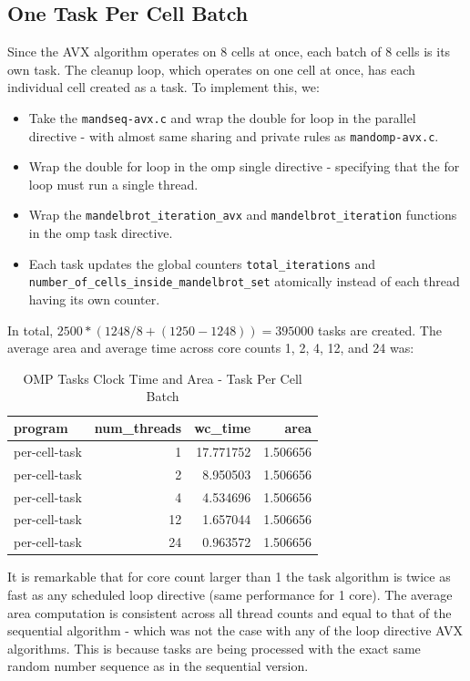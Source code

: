 \documentclass{article}
\begin{document}
\subsection{One Task Per Cell Batch}
Since the AVX algorithm operates on 8 cells at once, 
each batch of 8 cells is its own task. The cleanup loop, which operates on one cell at once, has each individual cell 
created as a task. To implement this, we:
\begin{itemize}
    \item Take the \texttt{mandseq-avx.c} and wrap the double for loop in the parallel directive - with almost same sharing and private rules as \texttt{mandomp-avx.c}.
    \item Wrap the double for loop in the omp single directive - specifying that the for loop must run a single thread. 
    \item Wrap the \texttt{mandelbrot\_iteration\_avx} and \texttt{mandelbrot\_iteration} functions in the omp task directive.
    \item Each task updates the global counters \texttt{total\_iterations} and \texttt{number\_of\_cells\_inside\_mandelbrot\_set} atomically instead of each thread having its own counter.
\end{itemize}
In total, $2500 * (1248 / 8 + (1250 - 1248)) = 395000$ tasks are created.
The average area and average time across core counts 1, 2, 4, 12, and 24 was:
\begin{table}[H]
    \centering
    \caption{OMP Tasks Clock Time and Area - Task Per Cell Batch}
    \fontsize{12}{14}\selectfont
    \begin{tabular}[t]{l|r|r|r}
    \hline
    program & num\_threads & wc\_time & area\\
    \hline
    per-cell-task & 1 & 17.771752 & 1.506656\\
    \hline
    per-cell-task & 2 & 8.950503 & 1.506656\\
    \hline
    per-cell-task & 4 & 4.534696 & 1.506656\\
    \hline
    per-cell-task & 12 & 1.657044 & 1.506656\\
    \hline
    per-cell-task & 24 & 0.963572 & 1.506656\\
    \hline
    \end{tabular}
    \end{table}
\noindent It is remarkable that for core count larger than 1 the task algorithm is twice as fast as any scheduled loop directive (same performance for 1 core). 
The average area computation is consistent across all thread counts and equal to that of the sequential algorithm - which was not the case with any of the 
loop directive AVX algorithms. This is because tasks are being processed with the exact same random number sequence as in the sequential version.
\end{document}

